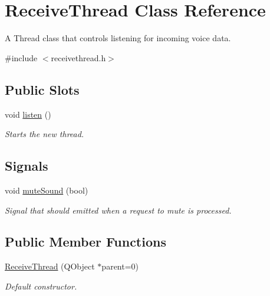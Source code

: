 \hypertarget{class_receive_thread}{
\section{\-Receive\-Thread \-Class \-Reference}
\label{class_receive_thread}
}


\-A \-Thread class that controls listening for incoming voice data.  




{\ttfamily \#include $<$receivethread.\-h$>$}

\subsection*{\-Public \-Slots}
\begin{DoxyCompactItemize}
\item 
\hypertarget{class_receive_thread_a0eb5b7ab172cf0a35fee1e499d1a04e2}{
void \hyperlink{class_receive_thread_a0eb5b7ab172cf0a35fee1e499d1a04e2}{listen} ()}
\label{class_receive_thread_a0eb5b7ab172cf0a35fee1e499d1a04e2}

\begin{DoxyCompactList}\small\item\em \-Starts the new thread. \end{DoxyCompactList}\end{DoxyCompactItemize}
\subsection*{\-Signals}
\begin{DoxyCompactItemize}
\item 
void \hyperlink{class_receive_thread_a971403a676eb058555b5099f04a5b546}{mute\-Sound} (bool)
\begin{DoxyCompactList}\small\item\em \-Signal that should emitted when a request to mute is processed. \end{DoxyCompactList}\end{DoxyCompactItemize}
\subsection*{\-Public \-Member \-Functions}
\begin{DoxyCompactItemize}
\item 
\hyperlink{class_receive_thread_a7d3037d96e9f4f93850026dca7ff0787}{\-Receive\-Thread} (\-Q\-Object $\ast$parent=0)
\begin{DoxyCompactList}\small\item\em \-Default constructor. \end{DoxyCompactList}\end{DoxyCompactItemize}
